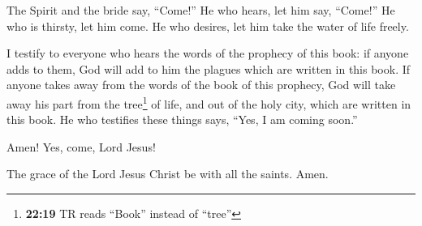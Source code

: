  The Spirit and the bride say, ``Come!'' He who hears,
let him say, ``Come!'' He who is thirsty, let him come. He who desires,
let him take the water of life freely.

 I testify to everyone who hears the words of the
prophecy of this book: if anyone adds to them, God will add to him the
plagues which are written in this book.  If anyone takes
away from the words of the book of this prophecy, God will take away his
part from the tree\footnote{\textbf{22:19} TR reads ``Book'' instead of
  ``tree''} of life, and out of the holy city, which are written in this
book.  He who testifies these things says, ``Yes, I am
coming soon.''

Amen! Yes, come, Lord Jesus!

 The grace of the Lord Jesus Christ be with all the
saints. Amen.
